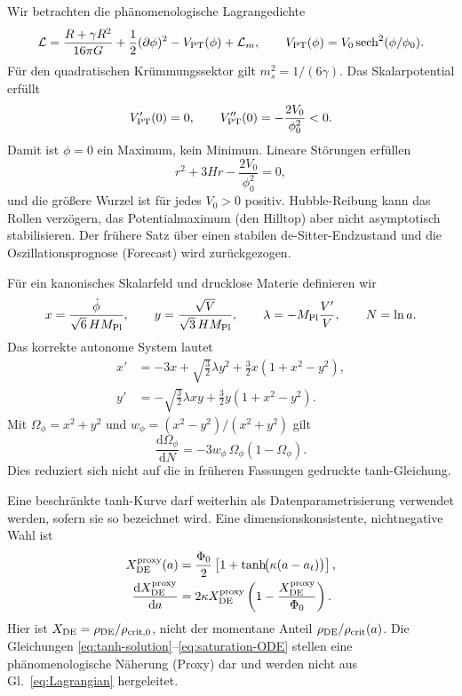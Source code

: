 \documentclass[12pt,a4paper]{article}
\theoremstyle{definition}
\theoremstyle{plain}
\theoremstyle{remark}
\newcommand{\dd}{\mathrm{d}}
\begin{document}
Wir betrachten die phänomenologische Lagrangedichte
\begin{equation}\label{eq:Lagrangian}
 \mathcal L=
 \frac{R+\gamma R^2}{16\pi G}
 +\frac12(\partial\phi)^2
 -V_{\rm PT}(\phi)+\mathcal L_m ,
 \qquad
 V_{\rm PT}(\phi)=V_0\,{\rm sech}^2(\phi/\phi_0).
\end{equation}
Für den quadratischen Krümmungssektor gilt \(m_s^2=1/(6\gamma)\). Das
Skalarpotential erfüllt
\begin{equation}\label{eq:VPT-curvature}
 V_{\rm PT}'(0)=0,\qquad
 V_{\rm PT}''(0)=-\frac{2V_0}{\phi_0^2}<0 .
\end{equation}
Damit ist \(\phi=0\) ein Maximum, kein Minimum. Lineare Störungen erfüllen
\[
 r^2+3Hr-\frac{2V_0}{\phi_0^2}=0 ,
\]
und die größere Wurzel ist für jedes \(V_0>0\) positiv. Hubble-Reibung kann
das Rollen verzögern, das Potentialmaximum (den Hilltop) aber nicht asymptotisch stabilisieren. Der
frühere Satz über einen stabilen de-Sitter-Endzustand und die
Oszillationsprognose (Forecast) wird zurückgezogen.

Für ein kanonisches Skalarfeld und drucklose Materie definieren wir
\[
 x=\frac{\dot\phi}{\sqrt6\,HM_{\rm Pl}},\qquad
 y=\frac{\sqrt{V}}{\sqrt3\,HM_{\rm Pl}},\qquad
 \lambda=-M_{\rm Pl}\frac{V'}{V},\qquad N=\ln a .
\]
Das korrekte autonome System lautet
\begin{align}
 x'&=-3x+\sqrt{\frac32}\lambda y^2
      +\frac32x(1+x^2-y^2),\label{eq:dx}\\
 y'&=-\sqrt{\frac32}\lambda xy
      +\frac32y(1+x^2-y^2).\label{eq:dy}
\end{align}
Mit \(\Omega_\phi=x^2+y^2\) und
\(w_\phi=(x^2-y^2)/(x^2+y^2)\) gilt
\begin{equation}\label{eq:dOmega-exact}
 \frac{\dd\Omega_\phi}{\dd N}
 =-3w_\phi\,\Omega_\phi(1-\Omega_\phi).
\end{equation}
Dies reduziert sich nicht auf die in früheren Fassungen gedruckte
tanh-Gleichung.

Eine beschränkte tanh-Kurve darf weiterhin als Datenparametrisierung verwendet
werden, sofern sie so bezeichnet wird. Eine dimensionskonsistente,
nichtnegative Wahl ist
\begin{align}
 X_{\rm DE}^{\rm proxy}(a)
 &=\frac{\Phi_0}{2}\left[1+
 \tanh\!\bigl(\kappa(a-a_t)\bigr)\right],\label{eq:tanh-solution}\\
 \frac{\dd X_{\rm DE}^{\rm proxy}}{\dd a}
 &=2\kappa X_{\rm DE}^{\rm proxy}
 \left(1-\frac{X_{\rm DE}^{\rm proxy}}{\Phi_0}\right).
 \label{eq:saturation-ODE}
\end{align}
Hier ist \(X_{\rm DE}=\rho_{\rm DE}/\rho_{\rm crit,0}\), nicht der momentane
Anteil \(\rho_{\rm DE}/\rho_{\rm crit}(a)\). Die Gleichungen
\eqref{eq:tanh-solution}--\eqref{eq:saturation-ODE} stellen eine
phänomenologische Näherung (Proxy) dar und werden nicht aus Gl.~\eqref{eq:Lagrangian}
hergeleitet.
\end{document}
